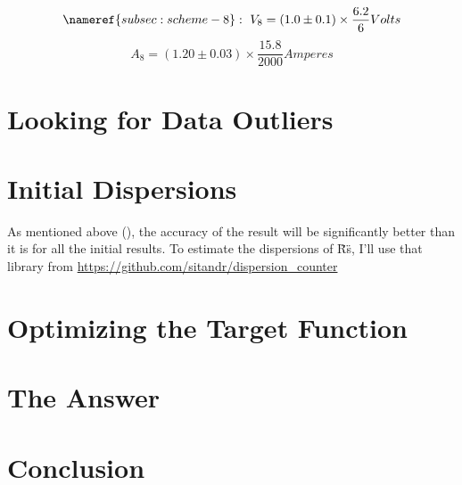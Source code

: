 \documentclass[11pt]{memoir}
\newcommand{\initialCurrentDispersion}{0.03}
\newcommand{\initialVoltageDispersion}{0.1}
\newcommand{\voltageConvertingFrac}{\frac{6.2}{6}}
\newcommand{\currentConvertingFrac}{\frac{15.8}{2000}}
\begin{document}
    \begin{equation*}
        \nameref{subsec:scheme-8}: ~
        V_8 = \left( 1.0 \pm \initialVoltageDispersion \right) \times \voltageConvertingFrac Volts
    \end{equation*}
    \begin{equation*}
        A_8 = \left( 1.20 \pm \initialCurrentDispersion \right) \times \currentConvertingFrac Amperes
    \end{equation*}


    \newpage
    \section {Looking for Data Outliers}\label{sec:looking-for-data-outliers}

    \newpage
    \section {Initial Dispersions}\label{sec:initial-dispersions}
    \newline
    As mentioned above (), the accuracy of the result will be significantly better than it is for all the initial results.\newline
    To estimate the dispersions of \"R\"s, I'll use that library from \newline
    \url{https://github.com/sitandr/dispersion_counter}\newline


    \newpage
    \section{Optimizing the Target Function}\label{sec:optimizing-the-target-function}

    \newpage
    \section{The Answer}\label{sec:answer}

    \newpage
    \section{Conclusion}\label{sec:conclusion}



\end{document}
